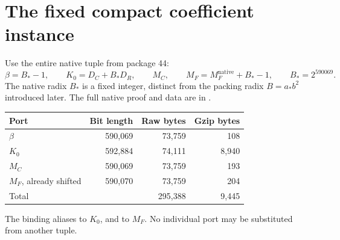 \documentclass[11pt,a4paper]{article}
\theoremstyle{remark}
\newcommand{\code}[1]{\texttt{\detokenize{#1}}}
\begin{document}
\section{The fixed compact coefficient instance}
\label{sec:coefficients}

Use the entire native tuple from package 44:
\[
 \beta=B_\ast-1,\qquad K_0=D_C+B_\ast D_R,\qquad
 M_C,\qquad M_F=M_F^{\mathrm{native}}+B_\ast-1,\qquad
 B_\ast=2^{590069}.
\]
The native radix \(B_\ast\) is a fixed integer, distinct from the
packing radix \(B=a_\ast b^2\) introduced later. The full native
proof and data are in .

\begin{center}
\begin{tabular}{@{}lrrr@{}}
\toprule
Port & Bit length & Raw bytes & Gzip bytes\\
\midrule
\(\beta\) & 590,069 & 73,759 & 108\\
\(K_0\) & 592,884 & 74,111 & 8,940\\
\(M_C\) & 590,069 & 73,759 & 193\\
\(M_F\), already shifted & 590,070 & 73,759 & 204\\
\midrule
Total & & 295,388 & 9,445\\
\bottomrule
\end{tabular}
\end{center}
The binding aliases \code{K} to \(K_0\), and \code{MF_source} to
\(M_F\). No individual port may be substituted from another tuple.
\end{document}
